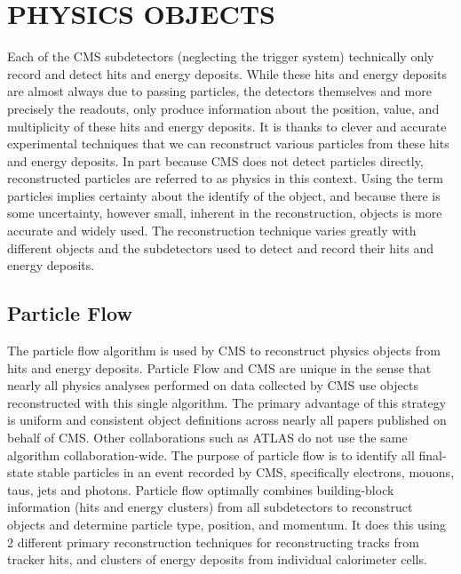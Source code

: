 %
%

\chapter{PHYSICS OBJECTS}
Each of the CMS subdetectors (neglecting the trigger system) technically only record and detect hits and energy deposits. While these hits and energy deposits are almost
always due to passing particles, the detectors themselves and more precisely the readouts, only produce information about the position, value, and multiplicity of
these hits and energy deposits. It is thanks to clever and accurate experimental techniques that we can reconstruct various particles from these hits and energy deposits.
In part because CMS does not detect particles directly, reconstructed particles are referred to as physics  in this context. Using
the term particles implies certainty about the identify of the object, and because there is some uncertainty, however small, inherent in the reconstruction, objects is
more accurate and widely used. The reconstruction technique varies greatly with different objects and the subdetectors used to detect and record their hits and energy
deposits. 

\section{Particle Flow}
The particle flow algorithm is used by CMS to reconstruct physics objects from hits and energy deposits. Particle Flow and CMS are unique in the sense
that nearly all physics analyses performed on data collected by CMS use objects reconstructed with this single algorithm. The primary advantage of this strategy is
uniform and consistent object definitions across nearly all papers published on behalf of CMS. Other collaborations such as ATLAS do not use
the same algorithm collaboration-wide. The purpose of particle flow is to identify all final-state stable particles in an event recorded by CMS, specifically electrons,
mouons, taus, jets and photons. Particle flow optimally combines building-block information (hits and energy clusters) from all subdetectors to reconstruct objects and
determine particle type, position, and momentum. It does this using 2 different primary reconstruction techniques for reconstructing tracks from tracker hits, and clusters
of energy deposits from individual calorimeter cells. 


